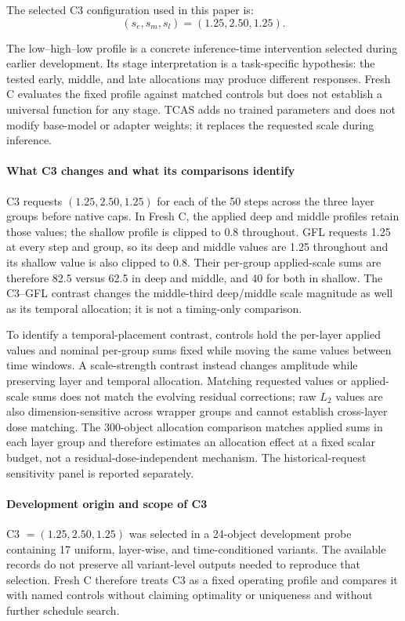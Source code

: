 \documentclass[times,twocolumn,final]{elsarticle}
\begin{document}
The selected C3 configuration used in this paper is:
\begin{equation}
(s_e, s_m, s_l) = (1.25, 2.50, 1.25).
\end{equation}

The low--high--low profile is a concrete inference-time intervention selected during earlier development. Its stage interpretation is a task-specific hypothesis: the tested early, middle, and late allocations may produce different responses. Fresh C evaluates the fixed profile against matched controls but does not establish a universal function for any stage. TCAS adds no trained parameters and does not modify base-model or adapter weights; it replaces the requested scale during inference.

\paragraph{What C3 changes and what its comparisons identify}
C3 requests $(1.25,2.50,1.25)$ for each of the 50 steps across the three layer groups before native caps. In Fresh C, the applied deep and middle profiles retain those values; the shallow profile is clipped to 0.8 throughout. GFL requests 1.25 at every step and group, so its deep and middle values are 1.25 throughout and its shallow value is also clipped to 0.8. Their per-group applied-scale sums are therefore 82.5 versus 62.5 in deep and middle, and 40 for both in shallow. The C3--GFL contrast changes the middle-third deep/middle scale magnitude as well as its temporal allocation; it is not a timing-only comparison.

To identify a temporal-placement contrast, controls hold the per-layer applied values and nominal per-group sums fixed while moving the same values between time windows. A scale-strength contrast instead changes amplitude while preserving layer and temporal allocation. Matching requested values or applied-scale sums does not match the evolving residual corrections; raw $L_2$ values are also dimension-sensitive across wrapper groups and cannot establish cross-layer dose matching. The 300-object allocation comparison matches applied sums in each layer group and therefore estimates an allocation effect at a fixed scalar budget, not a residual-dose-independent mechanism. The historical-request sensitivity panel is reported separately.

\paragraph{Development origin and scope of C3}
C3 $=(1.25,2.50,1.25)$ was selected in a 24-object development probe containing 17 uniform, layer-wise, and time-conditioned variants. The available records do not preserve all variant-level outputs needed to reproduce that selection. Fresh C therefore treats C3 as a fixed operating profile and compares it with named controls without claiming optimality or uniqueness and without further schedule search.
\end{document}
